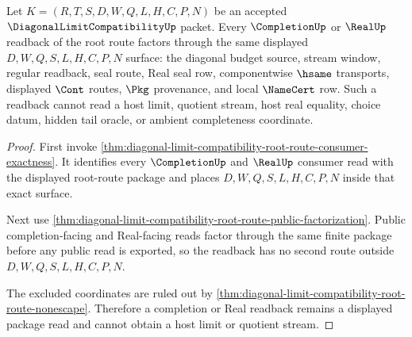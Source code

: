 \begin{theorem}
\label{thm:diagonal-limit-compatibility-root-route-completion-readback}
Let $K=(R,T,S,D,W,Q,L,H,C,P,N)$ be an accepted $\DiagonalLimitCompatibilityUp$ packet. Every $\CompletionUp$ or $\RealUp$ readback of the root route factors through the same displayed $D,W,Q,S,L,H,C,P,N$ surface: the diagonal budget source, stream window, regular readback, seal route, Real seal row, componentwise $\hsame$ transports, displayed $\Cont$ routes, $\Pkg$ provenance, and local $\NameCert$ row. Such a readback cannot read a host limit, quotient stream, host real equality, choice datum, hidden tail oracle, or ambient completeness coordinate.
\end{theorem}
\begin{proof}
First invoke \autoref{thm:diagonal-limit-compatibility-root-route-consumer-exactness}. It identifies every $\CompletionUp$ and $\RealUp$ consumer read with the displayed root-route package and places $D,W,Q,S,L,H,C,P,N$ inside that exact surface.

Next use \autoref{thm:diagonal-limit-compatibility-root-route-public-factorization}. Public completion-facing and Real-facing reads factor through the same finite package before any public read is exported, so the readback has no second route outside $D,W,Q,S,L,H,C,P,N$.

The excluded coordinates are ruled out by \autoref{thm:diagonal-limit-compatibility-root-route-nonescape}. Therefore a completion or Real readback remains a displayed package read and cannot obtain a host limit or quotient stream.
\end{proof}


